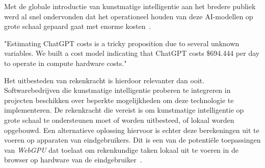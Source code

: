 
Met de globale introductie van kunstmatige intelligentie aan het bredere publiek werd al snel ondervonden dat het operationeel houden van deze AI-modellen op grote schaal gepaard gaat met enorme kosten~\autocite{Patel2023}.

\begin{displayquote}
    "Estimating ChatGPT costs is a tricky proposition due to several unknown variables. We built a cost model indicating that ChatGPT costs \$694.444 per day to operate in compute hardware costs."
\end{displayquote}

Het uitbesteden van rekenkracht is hierdoor relevanter dan ooit. Softwarebedrijven die kunstmatige intelligentie proberen te integreren in projecten beschikken over beperkte mogelijkheden om deze technologie te implementeren. De rekenkracht die vereist is om kunstmatige intelligentie op grote schaal te ondersteunen moet of worden uitbesteed, of lokaal worden opgebouwd. Een alternatieve oplossing hiervoor is echter deze berekeningen uit te voeren op apparaten van eindgebruikers. Dit is een van de potentiële toepassingen van \textit{WebGPU} dat toelaat om rekenkundige taken lokaal uit te voeren in de browser op hardware van de eindgebruiker~\autocite{Wallez2023}.

\section{}%
\label{sec:onderzoeksvraag}


